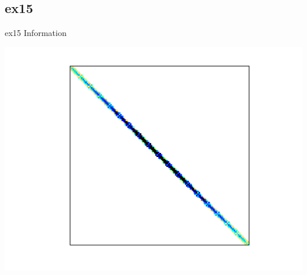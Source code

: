\subsection{ex15}
\begin{table}[h!]
	\begin{minipage}{0.5\linewidth}
		\caption{ex15 Information}
		\label{table:ex15}
		\centering
        
	\end{minipage}\hfill
	\begin{minipage}{0.45\linewidth}
		\centering
		\includegraphics[width=1\textwidth]{figs/ex15.png}
		\label{fig:ex15}
	\end{minipage}
\end{table}
